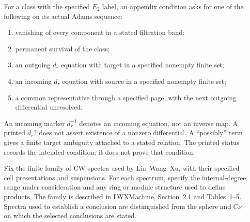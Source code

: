 \begin{definition}
  \label{def:appendix-row-status}
  \notready
  For a class with the specified $E_2$ label, an appendix condition
  asks for one of the following on its actual Adams sequence:
  \begin{enumerate}
    \item vanishing of every component in a stated filtration band;
    \item permanent survival of the class;
    \item an outgoing $d_r$ equation with target in a specified nonempty
      finite set;
    \item an incoming $d_r$ equation with source in a specified nonempty
      finite set;
    \item a common representative through a specified page, with the
      next outgoing differential unresolved.
  \end{enumerate}
  An incoming marker $d_r^{-1}$ denotes an incoming equation, not an
  inverse map. A printed $d_r?$ does not assert existence of a nonzero
  differential. A ``possibly'' term gives a finite target ambiguity
  attached to a stated relation. The printed status records the intended
  condition; it does not prove that condition.
\end{definition}

\begin{definition}
  \label{def:lin-spectrum-catalogue}
  \notready
  Fix the finite family of CW spectra used by Lin--Wang--Xu,
  with their specified cell presentations and suspensions. For each spectrum,
  specify the internal-degree range under consideration and any ring
  or module structure used to define products. The family is described
  in LWXMachine, Section~2.1 and Tables~1--5. Spectra used to establish
  a conclusion are distinguished from the sphere and $C\nu$ on which
  the selected conclusions are stated.
\end{definition}


